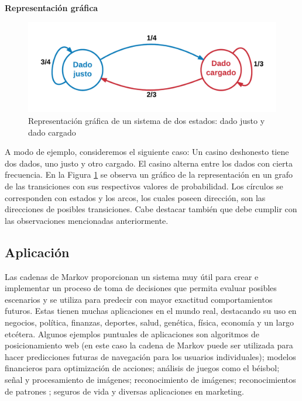 \textbf{Representación gráfica}
\begin{figure}[htp]
\centering
\captionsetup{width=.7\linewidth}
\includegraphics[width=.7\linewidth]{images/representacion_markovsimple.png}
\caption{Representación gráfica de un sistema de dos estados: dado justo y dado cargado}
\label{fig:markovsimple}
\end{figure}

A modo de ejemplo, consideremos el siguiente caso: Un casino deshonesto tiene dos dados, uno justo y otro cargado. El casino alterna entre los dados con cierta frecuencia. En la Figura \ref{fig:markovsimple} se observa un gráfico de la representación en un grafo de las transiciones con sus respectivos valores de probabilidad. Los círculos se corresponden con estados y los arcos, los cuales poseen dirección, son las direcciones de posibles transiciones. Cabe destacar también que debe cumplir con las observaciones mencionadas anteriormente.


\subsection{Aplicación}

Las cadenas de Markov proporcionan un sistema muy útil para crear e implementar un proceso de toma de decisiones que permita evaluar posibles escenarios y se utiliza para predecir con mayor exactitud comportamientos futuros. Estas tienen muchas aplicaciones en el mundo real, destacando su uso en negocios, política, finanzas, deportes, salud, genética, física, economía y un largo etcétera.
Algunos ejemplos puntuales de aplicaciones son algoritmos de posicionamiento web\cite{backaaker2012google} (en este caso la cadena de Markov puede ser utilizada para hacer predicciones futuras de navegación para los usuarios individuales); modelos financieros para optimización de acciones\cite{yang2011research}; análisis de juegos como el béisbol; señal y procesamiento de imágenes\cite{bishop2007pattern}; reconocimiento de imágenes\cite{bishop2007pattern}; reconocimientos de patrones \cite{bishop2007pattern}; seguros de vida y diversas aplicaciones en marketing\cite{datong2011markov}.

